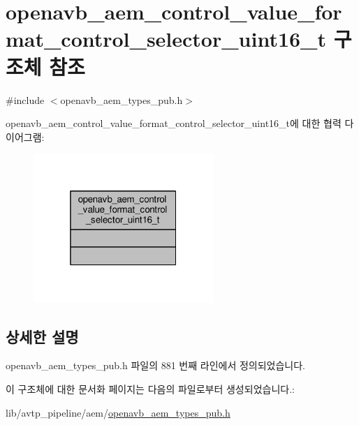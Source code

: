 \hypertarget{structopenavb__aem__control__value__format__control__selector__uint16__t}{}\section{openavb\+\_\+aem\+\_\+control\+\_\+value\+\_\+format\+\_\+control\+\_\+selector\+\_\+uint16\+\_\+t 구조체 참조}
\label{structopenavb__aem__control__value__format__control__selector__uint16__t}


{\ttfamily \#include $<$openavb\+\_\+aem\+\_\+types\+\_\+pub.\+h$>$}



openavb\+\_\+aem\+\_\+control\+\_\+value\+\_\+format\+\_\+control\+\_\+selector\+\_\+uint16\+\_\+t에 대한 협력 다이어그램\+:
\nopagebreak
\begin{figure}[H]
\begin{center}
\leavevmode
\includegraphics[width=193pt]{structopenavb__aem__control__value__format__control__selector__uint16__t__coll__graph}
\end{center}
\end{figure}


\subsection{상세한 설명}


openavb\+\_\+aem\+\_\+types\+\_\+pub.\+h 파일의 881 번째 라인에서 정의되었습니다.



이 구조체에 대한 문서화 페이지는 다음의 파일로부터 생성되었습니다.\+:\begin{DoxyCompactItemize}
\item 
lib/avtp\+\_\+pipeline/aem/\hyperlink{openavb__aem__types__pub_8h}{openavb\+\_\+aem\+\_\+types\+\_\+pub.\+h}\end{DoxyCompactItemize}
